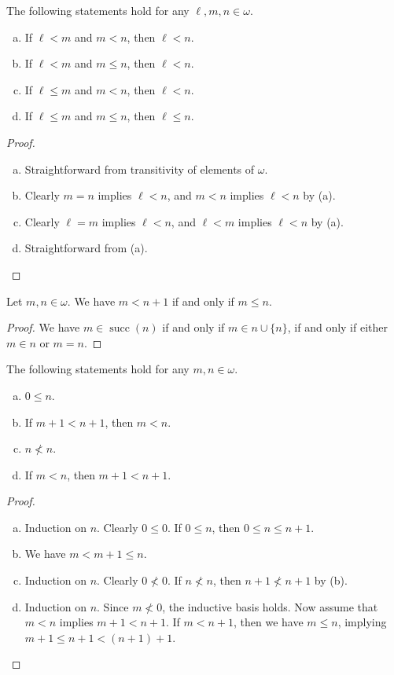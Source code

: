 \documentclass[11pt]{article}
\DeclareMathOperator{\suc}{succ}
\begin{document}
\begin{proposition}
  The following statements hold for any $\ell, m, n \in \omega$.
  \begin{enumerate}[(a)]
    \item If $\ell < m$ and $m < n$, then $\ell < n$.
    \item If $\ell < m$ and $m \leq n$, then $\ell < n$.
    \item If $\ell \leq m$ and $m < n$, then $\ell < n$.
    \item If $\ell \leq m$ and $m \leq n$, then $\ell \leq n$.
  \end{enumerate}
\end{proposition}
\begin{proof}
  \leavevmode
  \begin{enumerate}[(a)]
    \item Straightforward from transitivity of elements of $\omega$.
    \item Clearly $m = n$ implies $\ell < n$, and $m < n$ implies $\ell < n$ by (a).
    \item Clearly $\ell = m$ implies $\ell < n$, and $\ell < m$ implies $\ell < n$ by (a).
    \item Straightforward from (a).
    \qedhere
  \end{enumerate}
\end{proof}

\begin{proposition}
  Let $m, n \in \omega$.
  We have $m < n + 1$ if and only if $m \leq n$.
\end{proposition}
\begin{proof}
  We have $m \in \suc(n)$ if and only if $m \in n \cup \{n\}$, if and only if either $m \in n$ or $m = n$.
\end{proof}

\begin{proposition}
  The following statements hold for any $m, n \in \omega$.
  \begin{enumerate}[(a)]
    \item $0 \leq n$.
    \item If $m + 1 < n + 1$, then $m < n$.
    \item $n \not < n$.
    \item If $m < n$, then $m + 1 < n + 1$.
  \end{enumerate}
\end{proposition}
\begin{proof}
  \leavevmode
  \begin{enumerate}[(a)]
    \item Induction on $n$.
    Clearly $0 \leq 0$.
    If $0 \leq n$, then $0 \leq n \leq n + 1$.
    \item We have $m < m + 1 \leq n$.
    \item Induction on $n$.
    Clearly $0 \not < 0$.
    If $n \not < n$, then $n + 1 \not < n + 1$ by (b).
    \item Induction on $n$.
    Since $m \not < 0$, the inductive basis holds.
    Now assume that $m < n$ implies $m + 1 < n + 1$.
    If $m < n + 1$, then we have $m \leq n$, implying $m + 1 \leq n + 1 < (n + 1) + 1$.
    \qedhere
  \end{enumerate}
\end{proof}
\end{document}
